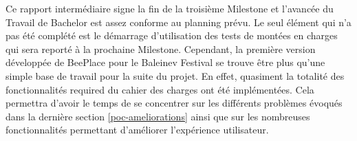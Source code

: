 Ce rapport intermédiaire signe la fin de la troisième Milestone et l'avancée du Travail de Bachelor est assez conforme au planning prévu. Le seul élément qui n'a pas été complété est le démarrage d'utilisation des tests de montées en charges qui sera reporté à la prochaine Milestone. Cependant, la première version développée de BeePlace pour le Baleinev Festival se trouve être plus qu'une simple base de travail pour la suite du projet. En effet, quasiment la totalité des fonctionnalités \guillemotleft{} required \guillemotright{} du cahier des charges ont été implémentées. Cela permettra d'avoir le temps de se concentrer sur les différents problèmes évoqués dans la dernière section \ref{poc-ameliorations} ainsi que sur les nombreuses fonctionnalités permettant d'améliorer l'expérience utilisateur.

\vfil
\hspace{8cm}\makeatletter\@author\makeatother\par
\hspace{8cm}\begin{minipage}{5cm}
\end{minipage}